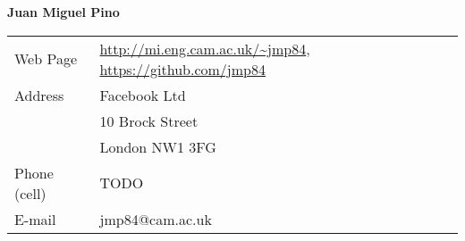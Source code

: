 \documentclass[letterpaper,11pt]{article}
\begin{document}
\begin{center}
  {\LARGE \bf Juan Miguel Pino}
\end{center}

\begin{tabular}{ll}
Web Page & \url{http://mi.eng.cam.ac.uk/~jmp84}, \url{https://github.com/jmp84} \\
Address & Facebook Ltd \\
        & 10 Brock Street \\
        & London NW1 3FG \\
Phone (cell) & TODO \\
E-mail & jmp84@cam.ac.uk \\
\end{tabular}



\vspace{1cm}
\end{document}
